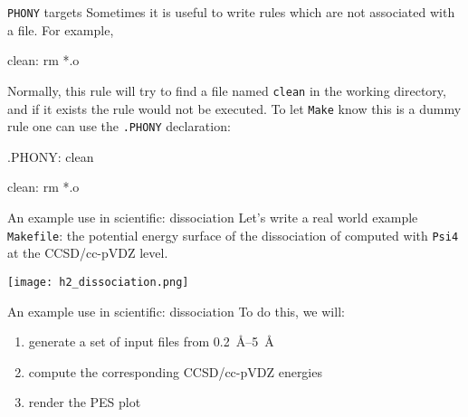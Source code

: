 \documentclass[10pt]{beamer}
\newcommand{\textco}[1]{\colorbox{bg_gray}{\texttt{#1}}}
\begin{document}
\begin{frame}[fragile]{\texttt{PHONY} targets}
  Sometimes it is useful to write rules which are not associated with a file.
  For example,
\begin{makefile}
clean:
    rm *.o
\end{makefile}
  \pause
  Normally, this rule will try to find a file named \textco{clean} in the
  working directory, and if it exists the rule would not be executed. To let
  \textco{Make} know this is a dummy rule one can use the \textco{.PHONY} declaration:
\begin{makefile}
.PHONY: clean

clean:
    rm *.o
\end{makefile}
\end{frame}


\begin{frame}[fragile]{An example use in scientific:  dissociation}
  Let's write a real world example \textco{Makefile}: the potential energy surface
  of the dissociation of  computed with \texttt{Psi4} at the CCSD/cc-pVDZ level.
  \begin{center}
    \texttt{[image: h2\_dissociation.png]}
  \end{center}
\end{frame}

\begin{frame}[fragile]{An example use in scientific:  dissociation}
  To do this, we will:
  \begin{enumerate}
    \item generate a set of input files from \SIrange{0.2}{5}{\angstrom}
    \item compute the corresponding CCSD/cc-pVDZ energies
    \item render the PES plot
  \end{enumerate}
  \pause
  \begin{center}
\end{center}
\end{frame}
\end{document}

